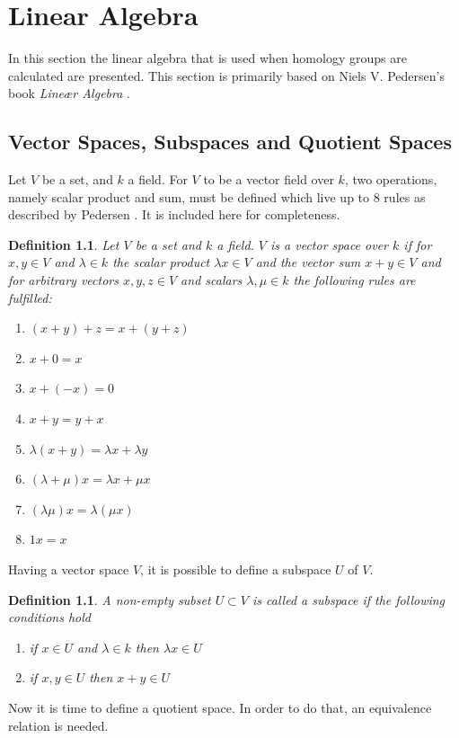 \documentclass[11pt,a4paper,twoside]{report}
\newtheorem{mydef}[mythm]{Definition}
\begin{document}
\appendix
\chapter{Linear Algebra}\label{ch:linalg}
In this section the linear algebra that is used when homology groups are calculated are presented. This section is primarily based on Niels V. Pedersen's book \emph{Lineær Algebra} \cite{LinAlg}.
\section{Vector Spaces, Subspaces and Quotient Spaces}
Let $V$ be a set, and $k$ a field. For $V$ to be a vector field over $k$, two operations, namely scalar product and sum, must be defined which live up to 8 rules as described by Pedersen \cite[pp. 85-86]{LinAlg}. It is included here for completeness.
\begin{mydef} 
Let $V$ be a set and $k$ a field. $V$ is a vector space over $k$ if for $x,y\in V$ and $\lambda\in k$ the scalar product $\lambda x\in V$ and the vector sum $x+y\in V$ and for arbitrary vectors $x,y,z\in V$ and scalars $\lambda,\mu\in k$ the following rules are fulfilled:
\begin{enumerate}
\item $(x+y)+z = x+(y+z)$
\item $x+0=x$
\item $x+(-x)=0$
\item $x+y=y+x$
\item $\lambda(x+y)=\lambda x+\lambda y$
\item $(\lambda+\mu)x=\lambda x + \mu x$
\item $(\lambda\mu)x=\lambda(\mu x)$
\item $1x=x$
\end{enumerate}
\end{mydef}
Having a vector space $V$, it is possible to define a subspace $U$ of $V$.\cite[p.93]{LinAlg}
\begin{mydef}
A non-empty subset $U\subset V$ is called a subspace if the following conditions hold
\begin{enumerate}
\item if $x\in U$ and $\lambda\in k$ then $\lambda x\in U$
\item if $x,y\in U$ then $x+y\in U$
\end{enumerate} 
\end{mydef}
Now it is time to define a quotient space. In order to do that, an equivalence relation is needed. 
\end{document}
